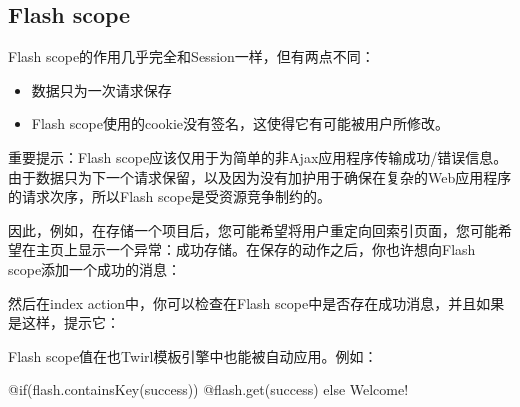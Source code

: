 \documentclass[letterpaper,10pt,english]{sphinxmanual}
\begin{document}
\subsection{Flash scope}
\label{\detokenize{index:flash-scope}}
Flash scope的作用几乎完全和Session一样，但有两点不同：
\begin{itemize}
\item {} 
数据只为一次请求保存

\item {} 
Flash scope使用的cookie没有签名，这使得它有可能被用户所修改。

\end{itemize}

重要提示：Flash scope应该仅用于为简单的非Ajax应用程序传输成功/错误信息。由于数据只为下一个请求保留，以及因为没有加护用于确保在复杂的Web应用程序的请求次序，所以Flash scope是受资源竞争制约的。

因此，例如，在存储一个项目后，您可能希望将用户重定向回索引页面，您可能希望在主页上显示一个异常：成功存储。在保存的动作之后，你也许想向Flash scope添加一个成功的消息：

\begin{sphinxVerbatim}[commandchars=\\\{\}]
   
     
     
\end{sphinxVerbatim}

然后在index action中，你可以检查在Flash scope中是否存在成功消息，并且如果是这样，提示它：

\begin{sphinxVerbatim}[commandchars=\\\{\}]
   
       
       
          
     
\end{sphinxVerbatim}

Flash scope值在也Twirl模板引擎中也能被自动应用。例如：

\begin{sphinxVerbatim}[commandchars=\\\{\}]
@if(flash.containsKey(\PYGZdq{}success\PYGZdq{})) \PYGZob{}
  @flash.get(\PYGZdq{}success\PYGZdq{})
\PYGZcb{} else \PYGZob{}
  Welcome!
\PYGZcb{}
\end{sphinxVerbatim}



\renewcommand{\indexname}{索引}
\printindex
\end{document}
